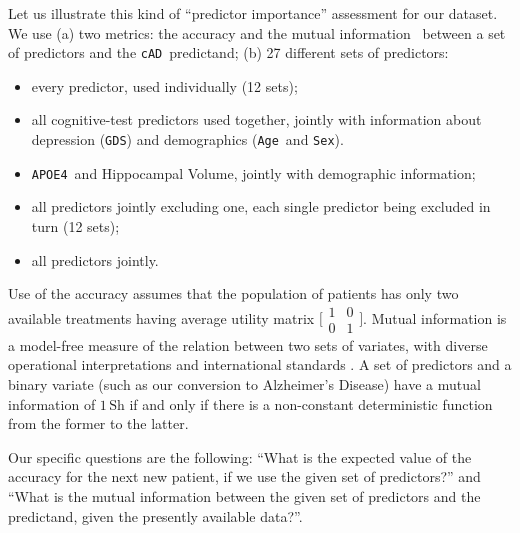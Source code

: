 \documentclass[utf8]{FrontiersinHarvard_mod} %
\newcommand*{\wrench}{{\fontencoding{U}\fontfamily{fontawesomethree}\selectfont\symbol{114}}}
\newcommand{\mynotew}[1]{{\color{notecolour}\wrench\ #1}}
\renewcommand*{\|}[1][]{\nonscript\:#1\vert\nonscript\:\mathopen{}}
\newcommand*{\age}{\texttt{Age}}
\newcommand*{\sex}{\texttt{Sex}}
\newcommand*{\apoe}{\texttt{APOE4}}
\newcommand*{\gds}{\texttt{GDS}}
\newcommand*{\cad}{\texttt{cAD}}
\newcommand*{\ad}{Alzheimer's Disease}
\begin{document}
Let us illustrate this kind of \enquote{predictor importance} assessment for our dataset. We use (a) two metrics: the accuracy and the mutual information~\citep{shannon1948,coveretal1991_r2006} between a set of predictors and the \cad\ predictand; (b) 27 different sets of predictors:
\begin{itemize}
\item every predictor, used individually (12 sets);
\item all cognitive-test predictors used together, jointly with information about depression (\gds) and demographics (\age\ and \sex).
\item \apoe\ and Hippocampal Volume, jointly with demographic information;
\item all predictors jointly excluding one, each single predictor being excluded in turn (12 sets);
\item all predictors jointly.
\end{itemize}

Use of the accuracy assumes that the population of patients has only two available treatments having average utility matrix $\bigl[\begin{smallmatrix} 1&0\\0&1 \end{smallmatrix}\bigr]$. Mutual information is a model-free measure of the relation between two sets of variates, with diverse operational interpretations \citep{mackay1995_r2005,woodward1953_r1964,minka1998d_r2003,good1961c,goodetal1968,kelly1956,kullback1959_r1978} and international standards \citep{iso2008c}. A set of predictors and a binary variate (such as our conversion to \ad) have a mutual information of $1\,\mathrm{Sh}$ if and only if there is a non-constant deterministic function from the former to the latter.

Our specific questions are the following: \enquote{What is the expected value of the accuracy for the next new patient, if we use the given set of predictors?} and \enquote{What is the mutual information between the given set of predictors and the predictand, given the presently available data?}.
\end{document}
